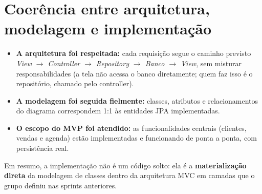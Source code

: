 \documentclass[12pt,a4paper]{article}
\begin{document}
\section{Coerência entre arquitetura, modelagem e implementação}

\begin{itemize}[leftmargin=*]
  \item \textbf{A arquitetura foi respeitada:} cada requisição segue o caminho
        previsto \emph{View $\rightarrow$ Controller $\rightarrow$ Repository
        $\rightarrow$ Banco $\rightarrow$ View}, sem misturar responsabilidades
        (a tela não acessa o banco diretamente; quem faz isso é o repositório,
        chamado pelo controller).
  \item \textbf{A modelagem foi seguida fielmente:} classes, atributos e
        relacionamentos do diagrama correspondem 1:1 às entidades JPA implementadas.
  \item \textbf{O escopo do MVP foi atendido:} as funcionalidades centrais (clientes,
        vendas e agenda) estão implementadas e funcionando de ponta a ponta, com
        persistência real.
\end{itemize}

Em resumo, a implementação não é um código solto: ela é a \textbf{materialização
direta} da modelagem de classes dentro da arquitetura MVC em camadas que o grupo
definiu nas sprints anteriores.
\end{document}
